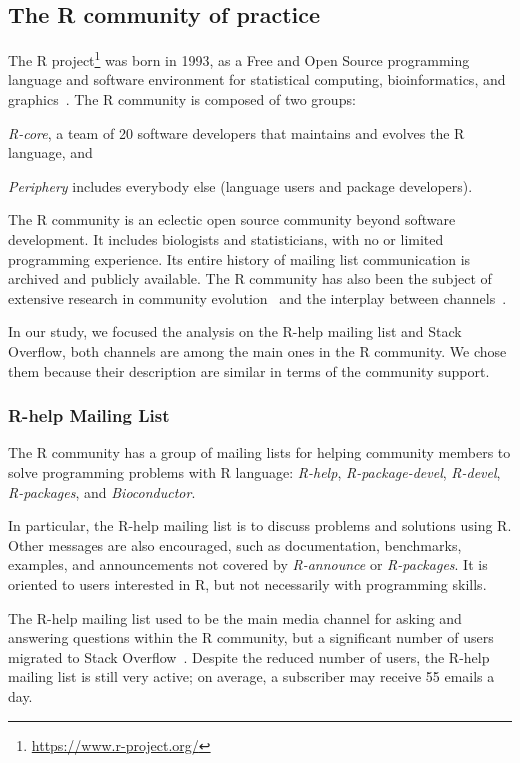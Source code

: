 \subsection{The R community of practice}
    
    The R project\footnote{\url{https://www.r-project.org/}} was born in 1993, as a Free and Open Source programming language and software environment for statistical computing, bioinformatics, and graphics~\cite{Ihaka1996}.
    The R community is composed of two groups:
    \begin{enumerate*}[label=(\arabic*)]
      \item \textit{R-core}, a team of 20 software developers that maintains and evolves the R language, and
      \item \textit{Periphery} includes everybody else (language users and package developers).
    \end{enumerate*}

    The R community is an eclectic open source community beyond software development.
    It includes biologists and statisticians, with no or limited programming experience.
    Its entire history of mailing list communication is archived and publicly available.
    The R community has also been the subject of extensive research in community evolution~\cite{German2013} and the interplay between channels~\cite{Vasilescu2014c}.

    In our study, we focused the analysis on the R-help mailing list and Stack Overflow, both channels are among the main ones in the R community.
    We chose them because their description are similar in terms of the community support.

\subsubsection{R-help Mailing List}
    The R community has a group of mailing lists for helping community members to solve programming problems with R language: \emph{R-help}, \emph{R-package-devel}, \emph{R-devel}, \emph{R-packages}, and \emph{Bioconductor}.

    In particular, the R-help mailing list is to discuss problems and solutions using R. 
    Other messages are also encouraged, such as documentation, benchmarks, examples, and announcements not covered by \emph{R-announce} or \emph{R-packages}.
    It is oriented to users interested in R, but not necessarily with programming skills.

    The R-help mailing list used to be the main media channel for asking and answering questions within the R community, but a significant number of users migrated to Stack Overflow~\cite{Vasilescu2014c}.
    Despite the reduced number of users, the R-help mailing list is still very active; on average, a subscriber may receive 55 emails a day.

